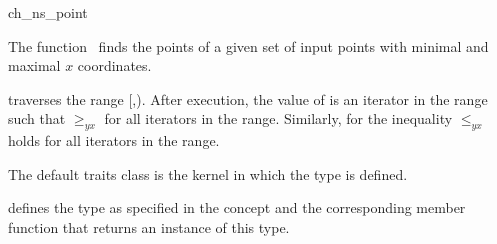 

\begin{ccRefFunction}{ch_ns_point}  %

\ccDefinition
  
The function \ccRefName\ finds the points of a given set  
of input points with minimal and maximal $x$ coordinates.


           {traverses the range [,).
            After execution, the value of
             is an iterator in the range such that  $\ge_{yx}$
             for all iterators  in the range. Similarly, for
             the inequality  $\le_{yx}$ 
            holds for all iterators in the range.}

The default traits class  is the kernel in which the
type  is defined.


 defines the type  as specified in
the concept  and the corresponding member
function that returns an instance of this type.


\ccSeeAlso

 \\
 \\
 \\
 \\
 \\

\end{ccRefFunction}


